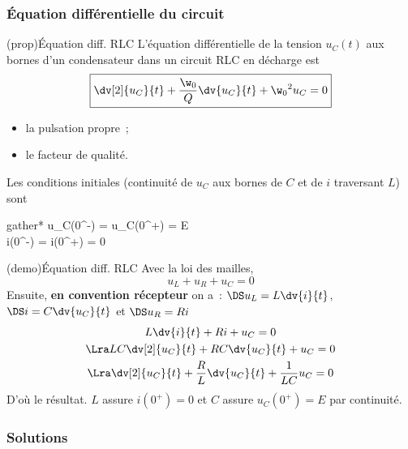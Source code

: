 \documentclass[../../main/main.tex]{subfiles}
\begin{document}
\subsubsection{Équation différentielle du circuit}
\begin{tcbraster}[raster columns=2, raster equal height=rows]
	\begin{tcb}[label=prop:eqdiffrc](prop){Équation diff. RLC}
		L'équation différentielle de la tension $u_C(t)$ aux bornes d'un
		condensateur dans un circuit RLC en décharge est
		\[ \boxed{\dv[2]{u_C}{t} + \frac{\w_0}{Q} \dv{u_C}{t} + \w_0{}^2u_C = 0}\]
		\begin{itemize}
			\item {} la pulsation propre~;
			\item {} le facteur de
			      qualité.
		\end{itemize}
		\tcblower
		Les conditions initiales (continuité de $u_C$ aux bornes de $C$
		et de $i$ traversant $L$) sont
		\begin{empheq}[box=\fbox]{gather*}
			u_C(0^-) = u_C(0^+) = E\\
			i(0^-) = i(0^+) = 0
		\end{empheq}
	\end{tcb}
	\begin{tcb}[label=demo:eqdiffrc](demo){Équation diff. RLC}
		Avec la loi des mailles,
		$$u_L + u_R + u_C = 0$$
		Ensuite, \textbf{en convention récepteur} on a~:
		$\DS u_L = L \dv{i}{t}$, $\DS i = C \dv{u_C}{t}$ et $\DS u_R = Ri$
		\begin{gather*}
			L \dv{i}{t} + Ri + u_C
			= 0\\
			\Lra LC \dv[2]{u_C}{t} + RC \dv{u_C}{t} + u_C                   = 0\\
			\Lra \dv[2]{u_C}{t} + \frac{R}{L} \dv{u_C}{t} + \frac{1}{LC}u_C = 0
		\end{gather*}
		D'où le résultat. $L$ assure $i(0^+) = 0$ et $C$ assure $u_C(0^+) = E$
		par continuité.
	\end{tcb}
\end{tcbraster}

\subsubsection{Solutions}
\end{document}
